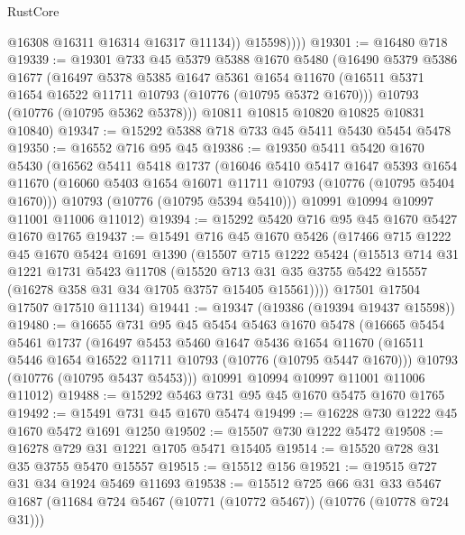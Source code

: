 \begin{lexlean}{RustCore}
\begin{coremodule}
                @16308
                @16311
                @16314
                @16317
                @11134))
            @15598))))
@19301 := @16480 @718
@19339 := @19301
    @733
    @45
    @5379
    @5388
    @1670
    @5480
    (@16490
      @5379
      @5386
      @1677
      (@16497
        @5378
        @5385
        @1647
        @5361
        @1654
        @11670
        (@16511 @5371 @1654 @16522 @11711 @10793 (@10776 (@10795 @5372 @1670)))
        @10793
        (@10776 (@10795 @5362 @5378)))
      @10811
      @10815
      @10820
      @10825
      @10831
      @10840)
@19347 := @15292 @5388 @718 @733 @45 @5411 @5430 @5454 @5478
@19350 := @16552 @716 @95 @45
@19386 := @19350
    @5411
    @5420
    @1670
    @5430
    (@16562
      @5411
      @5418
      @1737
      (@16046
        @5410
        @5417
        @1647
        @5393
        @1654
        @11670
        (@16060 @5403 @1654 @16071 @11711 @10793 (@10776 (@10795 @5404 @1670)))
        @10793
        (@10776 (@10795 @5394 @5410)))
      @10991
      @10994
      @10997
      @11001
      @11006
      @11012)
@19394 := @15292 @5420 @716 @95 @45 @1670 @5427 @1670 @1765
@19437 := @15491
    @716
    @45
    @1670
    @5426
    (@17466
      @715
      @1222
      @45
      @1670
      @5424
      @1691
      @1390
      (@15507
        @715
        @1222
        @5424
        (@15513
          @714
          @31
          @1221
          @1731
          @5423
          @11708
          (@15520 @713 @31 @35 @3755 @5422 @15557 (@16278 @358 @31 @34 @1705 @3757 @15405 @15561))))
      @17501
      @17504
      @17507
      @17510
      @11134)
@19441 := @19347 (@19386 (@19394 @19437 @15598))
@19480 := @16655
    @731
    @95
    @45
    @5454
    @5463
    @1670
    @5478
    (@16665
      @5454
      @5461
      @1737
      (@16497
        @5453
        @5460
        @1647
        @5436
        @1654
        @11670
        (@16511 @5446 @1654 @16522 @11711 @10793 (@10776 (@10795 @5447 @1670)))
        @10793
        (@10776 (@10795 @5437 @5453)))
      @10991
      @10994
      @10997
      @11001
      @11006
      @11012)
@19488 := @15292 @5463 @731 @95 @45 @1670 @5475 @1670 @1765
@19492 := @15491 @731 @45 @1670 @5474
@19499 := @16228 @730 @1222 @45 @1670 @5472 @1691 @1250
@19502 := @15507 @730 @1222 @5472
@19508 := @16278 @729 @31 @1221 @1705 @5471 @15405
@19514 := @15520 @728 @31 @35 @3755 @5470 @15557
@19515 := @15512 @156
@19521 := @19515 @727 @31 @34 @1924 @5469 @11693
@19538 := @15512
    @725
    @66
    @31
    @33
    @5467
    @1687
    (@11684 @724 @5467 (@10771 (@10772 @5467)) (@10776 (@10778 @724 @31)))

\end{coremodule}
\end{lexlean}
